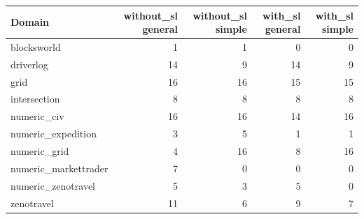 \begin{tabular}{lrrrr}
\toprule
Domain & without\_sl general & without\_sl simple & with\_sl general & with\_sl simple \\
\midrule
blocksworld & 1 & 1 & 0 & 0 \\
driverlog & 14 & 9 & 14 & 9 \\
grid & 16 & 16 & 15 & 15 \\
intersection & 8 & 8 & 8 & 8 \\
numeric\_civ & 16 & 16 & 14 & 16 \\
numeric\_expedition & 3 & 5 & 1 & 1 \\
numeric\_grid & 4 & 16 & 8 & 16 \\
numeric\_markettrader & 7 & 0 & 0 & 0 \\
numeric\_zenotravel & 5 & 3 & 5 & 0 \\
zenotravel & 11 & 6 & 9 & 7 \\
\bottomrule
\end{tabular}
